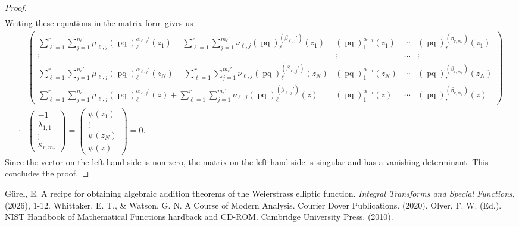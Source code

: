 \documentclass[10pt,a4paper]{amsart}
\DeclareMathOperator{\pq}{pq}
\begin{document}
\begin{proof}
\begin{align*}
\end{align*}
Writing these equations in the matrix form gives us
\begin{align*}
    &\begin{pmatrix}
\sum_{\ell=1}^r\sum_{j=1}^{n_\ell'} \mu_{\ell,j}(\pq)_\ell^{\alpha_{\ell,j}'}(z_1)+\sum_{\ell=1}^r\sum_{j=1}^{m_\ell'} \nu_{\ell,j}(\pq)_\ell^{(\beta_{\ell,j}')}(z_1)& (\pq)_1^{\alpha_{1,1}}(z_1) &  \cdots & (\pq)_r^{(\beta_{r,m_r})}(z_1)  \\
 \vdots& \vdots & \cdots & \vdots \\
\sum_{\ell=1}^r\sum_{j=1}^{n_\ell'} \mu_{\ell,j}(\pq)_\ell^{\alpha_{\ell,j}'}(z_N)+\sum_{\ell=1}^r\sum_{j=1}^{m_\ell'} \nu_{\ell,j}(\pq)_\ell^{(\beta_{\ell,j}')}(z_N)& (\pq)_1^{\alpha_{1,1}}(z_N) &  \cdots & (\pq)_r^{(\beta_{r,m_r})}(z_N) \\
\sum_{\ell=1}^r\sum_{j=1}^{n_\ell'} \mu_{\ell,j}(\pq)_\ell^{\alpha_{\ell,j}'}(z)+\sum_{\ell=1}^r\sum_{j=1}^{m_\ell'} \nu_{\ell,j}(\pq)_\ell^{(\beta_{\ell,j}')}(z)& (\pq)_1^{\alpha_{1,1}}(z) &  \cdots & (\pq)_r^{(\beta_{r,m_r})}(z)
\end{pmatrix}\\
\cdot&\begin{pmatrix}
-1 \\
 \lambda_{1,1}\\
\vdots\\
\kappa_{r,m_r}
\end{pmatrix}=\begin{pmatrix}
\psi(z_1) \\
\vdots\\
\psi(z_N)\\
\psi(z)
\end{pmatrix}=0.
\end{align*}
Since the vector on the left-hand side is non-zero, the matrix on the left-hand side is singular and has a vanishing determinant. This concludes the proof.
\end{proof}


\begin{thebibliography}{99}
 Gürel, E. A recipe for obtaining algebraic addition theorems of the Weierstrass elliptic function. \textit{Integral Transforms and Special Functions}, (2026), 1-12.
 Whittaker, E. T., \& Watson, G. N. A Course of Modern Analysis. Courier Dover Publications. (2020).
 Olver, F. W. (Ed.). NIST Handbook of Mathematical Functions hardback and CD-ROM. Cambridge University Press. (2010).
\end{thebibliography}
\end{document}
